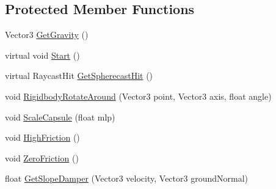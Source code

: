 \subsection*{Protected Member Functions}
\begin{DoxyCompactItemize}
\item 
Vector3 \mbox{\hyperlink{class_root_motion_1_1_demos_1_1_character_base_ab7d3a5a30808874fd072a1fb448342b6}{Get\+Gravity}} ()
\item 
virtual void \mbox{\hyperlink{class_root_motion_1_1_demos_1_1_character_base_aa228af260814ffafccbfefb73915c03e}{Start}} ()
\item 
virtual Raycast\+Hit \mbox{\hyperlink{class_root_motion_1_1_demos_1_1_character_base_a81b8de40eb51e84a174ed69548730464}{Get\+Spherecast\+Hit}} ()
\item 
void \mbox{\hyperlink{class_root_motion_1_1_demos_1_1_character_base_acc6152288ddb9632242ee8ae18c34018}{Rigidbody\+Rotate\+Around}} (Vector3 point, Vector3 axis, float angle)
\item 
void \mbox{\hyperlink{class_root_motion_1_1_demos_1_1_character_base_a6b1e7929b6d0d7d327b789bf3da058b4}{Scale\+Capsule}} (float mlp)
\item 
void \mbox{\hyperlink{class_root_motion_1_1_demos_1_1_character_base_a8bda3f2b49f7d0fb80be5eacb1090186}{High\+Friction}} ()
\item 
void \mbox{\hyperlink{class_root_motion_1_1_demos_1_1_character_base_a1f41f972d31a880d63bf65430b053e5e}{Zero\+Friction}} ()
\item 
float \mbox{\hyperlink{class_root_motion_1_1_demos_1_1_character_base_a3d3040ec47e5a4cc2c35c4aa7ae5e227}{Get\+Slope\+Damper}} (Vector3 velocity, Vector3 ground\+Normal)
\end{DoxyCompactItemize}
